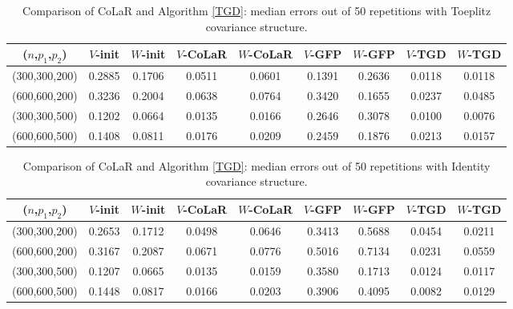 \documentclass[11pt]{article}
\newcommand{\0}{{\mathbf{0}}}
\begin{document}
\begin{table}[!tb]
\begin{tabular}{c|cc|cc|cc|cc}
\hline
 {($n$,$p_1$,$p_2$)} &  {$V$-init} &  {$W$-init} &  {$V$-CoLaR} &  {$W$-CoLaR} &  {$V$-GFP} &  {$W$-GFP} &  {$V$-TGD} &  {$W$-TGD} \\ \hline
 {(300,300,200)}      & 0.2885              & 0.1706              & 0.0511           & 0.0601           & 0.1391              & 0.2636              & 0.0118         & 0.0118         \\ 
 {(600,600,200)}      & 0.3236              & 0.2004              & 0.0638           & 0.0764           & 0.3420              & 0.1655              & 0.0237         & 0.0485         \\ 
 {(300,300,500)}      & 0.1202              & 0.0664              & 0.0135           & 0.0166           & 0.2646              & 0.3078              & 0.0100         & 0.0076         \\ 
 {(600,600,500)}      & 0.1408              & 0.0811              & 0.0176           & 0.0209           & 0.2459              & 0.1876              &         0.0213       &     0.0157           \\ \hline
\end{tabular}
\caption{Comparison of CoLaR and Algorithm \ref{TGD}: median errors out of 50 repetitions with Toeplitz covariance structure. }
\label{simcca1}
\end{table}
\begin{table}[!tb]
\begin{tabular}{c|cc|cc|cc|cc}
\hline
  {($n$,$p_1$,$p_2$)} &  {$V$-init} &  {$W$-init} &  {$V$-CoLaR} &  {$W$-CoLaR} &  {$V$-GFP} &  {$W$-GFP} &  {$V$-TGD} &  {$W$-TGD} \\ \hline
 {(300,300,200)}      & 0.2653              & 0.1712              & 0.0498           & 0.0646           & 0.3413              & 0.5688              & 0.0454         & 0.0211         \\ 
 {(600,600,200)}      & 0.3167              & 0.2087              & 0.0671           & 0.0776           & 0.5016              & 0.7134              & 0.0231         & 0.0559         \\ 
 {(300,300,500)}      & 0.1207              & 0.0665              & 0.0135           & 0.0159           & 0.3580              & 0.1713              & 0.0124         & 0.0117         \\ 
 {(600,600,500)}      & 0.1448              & 0.0817              & 0.0166           & 0.0203           & 0.3906              & 0.4095              & 0.0082         & 0.0129         \\ \hline
\end{tabular}
\caption{Comparison of CoLaR and Algorithm \ref{TGD}: median errors out of 50 repetitions with Identity covariance structure. 
}
\label{simcca2}
\end{table}
\end{document}

